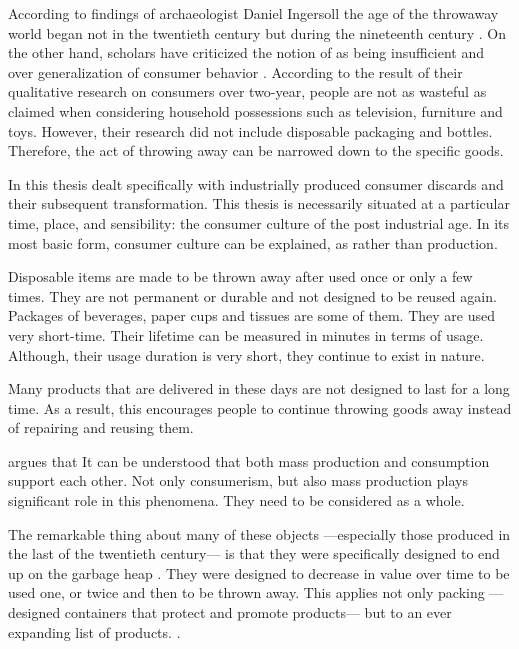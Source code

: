 According to findings of archaeologist Daniel Ingersoll the age of the throwaway world began not in the twentieth century but during the nineteenth century \citep[as cited in][41]{rathje1992rubbish}. On the other hand, scholars have criticized the notion of  as being insufficient and over generalization of consumer behavior \citep{gregson2007identity}. According to the result of their qualitative research on consumers over two-year, people are not as wasteful as claimed when considering household possessions such as television, furniture and toys. However, their research did not include disposable packaging and bottles. Therefore, the act of throwing away can be narrowed down to the specific goods.

In this thesis dealt specifically with industrially produced consumer discards and their subsequent transformation. This thesis is necessarily situated at a particular time, place, and sensibility: the consumer culture of the post industrial age. In its most basic form, consumer culture can be explained, as  \citep[2]{mamiya1992pop} rather than production.

Disposable items are made to be thrown away after used once or only a few times. They are not permanent or durable and not designed to be reused again. Packages of beverages, paper cups and tissues are some of them. They are used very short-time. Their lifetime can be measured in minutes in terms of usage. Although, their usage duration is very short, they continue to exist in nature.

Many products that are delivered in these days are not designed to last for a long time. As a result, this encourages people to continue throwing goods away instead of repairing and reusing them.

\citet[9]{hawkins2001plastic} argues that  It can be understood that both mass production and consumption support each other. Not only consumerism, but also mass production plays significant role in this phenomena. They need to be considered as a whole.

The remarkable thing about many of these objects ---especially those produced in the last of the twentieth century--- is that they were specifically designed to end up on the garbage heap \citep{cerny1996recycled}. They were designed to decrease in value over time to be used one, or twice and then to be thrown away. This applies not only packing ---designed containers that protect and promote products--- but to an ever expanding list of products.  \citep{cerny1996recycled}.


